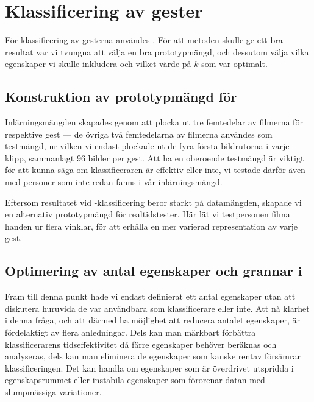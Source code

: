 \documentclass[../rapport_MVEX01-11-05]{subfiles}
\begin{document}
\section{Klassificering av gester} 

För klassificering av gesterna användes \knn. För att metoden skulle
ge ett bra resultat var vi tvungna att välja
en bra prototypmängd, och dessutom välja vilka egenskaper vi skulle inkludera
och vilket värde på $k$ som var optimalt.

\subsection{Konstruktion av prototypmängd för \knn}
Inlärningsmängden skapades genom att plocka ut tre femtedelar av filmerna för
respektive gest --- de övriga två femtedelarna av filmerna 
användes som testmängd, ur vilken vi endast plockade ut
de fyra första bildrutorna i varje klipp, sammanlagt 96 bilder per gest.
Att ha en oberoende testmängd är viktigt för att kunna säga om klassificeraren är
effektiv eller inte, vi testade därför även med personer som inte redan 
fanns i vår inlärningsmängd.

Eftersom resultatet vid \knn-klassificering beror starkt på datamängden,
skapade vi en alternativ prototypmängd för realtidstester.
Här lät vi testpersonen filma handen ur flera vinklar,
för att erhålla en mer varierad representation av varje gest.

\subsection{Optimering av antal egenskaper och grannar i \knn}\label{sec:metod_knn:optim}
Fram till denna punkt hade vi endast definierat ett antal egenskaper utan att
diskutera huruvida de var användbara som klassificerare eller inte. Att nå
klarhet i denna fråga, och att därmed ha möjlighet att reducera antalet
egenskaper, är
fördelaktigt av flera anledningar. Dels kan man märkbart förbättra
klassificerarens
tidseffektivitet då färre egenskaper behöver beräknas och analyseras, dels kan man
eliminera de egenskaper som kanske rentav försämrar klassificeringen.
Det kan handla om egenskaper som är överdrivet utspridda i
egenskapsrummet eller instabila egenskaper som förorenar datan med slumpmässiga
variationer.
\end{document}
